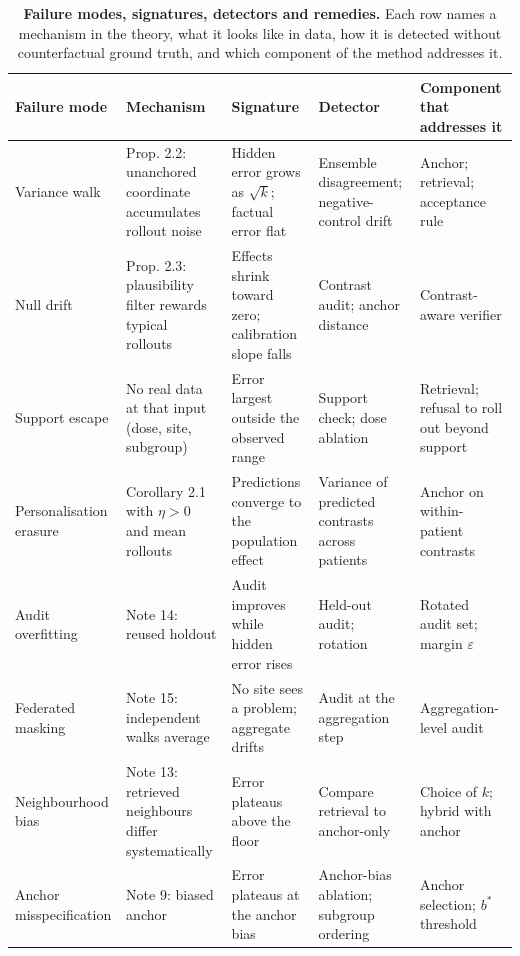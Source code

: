 \documentclass[11pt,a4paper]{article}
\begin{document}
\FloatBarrier
\begin{table}[!htbp]\centering\scriptsize
\caption{\textbf{Failure modes, signatures, detectors and remedies.} Each row names a mechanism in the theory, what it looks like in data, how it is detected without counterfactual ground truth, and which component of the method addresses it.}
\label{tab:s43}
\begin{tabularx}{\textwidth}{@{}p{2.5cm} Y p{2.6cm} p{2.4cm} p{2.6cm}@{}}\toprule
Failure mode & Mechanism & Signature & Detector & Component that addresses it\\\midrule
Variance walk & Prop. 2.2: unanchored coordinate accumulates rollout noise & Hidden error grows as $\sqrt{k}$; factual error flat & Ensemble disagreement; negative-control drift & Anchor; retrieval; acceptance rule\\
Null drift & Prop. 2.3: plausibility filter rewards typical rollouts & Effects shrink toward zero; calibration slope falls & Contrast audit; anchor distance & Contrast-aware verifier\\
Support escape & No real data at that input (dose, site, subgroup) & Error largest outside the observed range & Support check; dose ablation & Retrieval; refusal to roll out beyond support\\
Personalisation erasure & Corollary 2.1 with $\eta>0$ and mean rollouts & Predictions converge to the population effect & Variance of predicted contrasts across patients & Anchor on within-patient contrasts\\
Audit overfitting & Note 14: reused holdout & Audit improves while hidden error rises & Held-out audit; rotation & Rotated audit set; margin $\varepsilon$\\
Federated masking & Note 15: independent walks average & No site sees a problem; aggregate drifts & Audit at the aggregation step & Aggregation-level audit\\
Neighbourhood bias & Note 13: retrieved neighbours differ systematically & Error plateaus above the floor & Compare retrieval to anchor-only & Choice of $k$; hybrid with anchor\\
Anchor misspecification & Note 9: biased anchor & Error plateaus at the anchor bias & Anchor-bias ablation; subgroup ordering & Anchor selection; $b^*$ threshold\\
\bottomrule\end{tabularx}
\end{table}
\FloatBarrier
\end{document}
